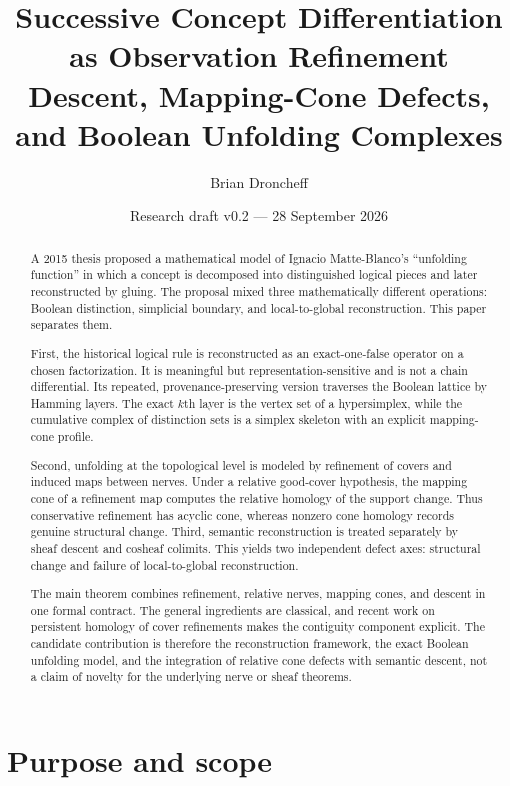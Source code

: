 \documentclass[11pt]{article}
\title{\textbf{Successive Concept Differentiation as Observation Refinement}\\
\large Descent, Mapping-Cone Defects, and Boolean Unfolding Complexes}
\author{Brian Droncheff}
\date{Research draft v0.2 --- 28 September 2026}
\begin{document}
\maketitle

\begin{abstract}
A 2015 thesis proposed a mathematical model of Ignacio Matte-Blanco's ``unfolding function'' in which a concept is decomposed into distinguished logical pieces and later reconstructed by gluing.  The proposal mixed three mathematically different operations: Boolean distinction, simplicial boundary, and local-to-global reconstruction.  This paper separates them.

First, the historical logical rule is reconstructed as an exact-one-false operator on a chosen factorization.  It is meaningful but representation-sensitive and is not a chain differential.  Its repeated, provenance-preserving version traverses the Boolean lattice by Hamming layers.  The exact $k$th layer is the vertex set of a hypersimplex, while the cumulative complex of distinction sets is a simplex skeleton with an explicit mapping-cone profile.

Second, unfolding at the topological level is modeled by refinement of covers and induced maps between nerves.  Under a relative good-cover hypothesis, the mapping cone of a refinement map computes the relative homology of the support change.  Thus conservative refinement has acyclic cone, whereas nonzero cone homology records genuine structural change.  Third, semantic reconstruction is treated separately by sheaf descent and cosheaf colimits.  This yields two independent defect axes: structural change and failure of local-to-global reconstruction.

The main theorem combines refinement, relative nerves, mapping cones, and descent in one formal contract.  The general ingredients are classical, and recent work on persistent homology of cover refinements makes the contiguity component explicit.  The candidate contribution is therefore the reconstruction framework, the exact Boolean unfolding model, and the integration of relative cone defects with semantic descent, not a claim of novelty for the underlying nerve or sheaf theorems.
\end{abstract}

\tableofcontents

\section{Purpose and scope}
\end{document}
